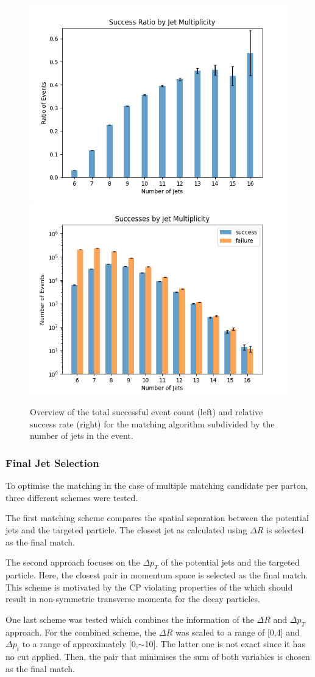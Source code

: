 \documentclass[bachelor,ngerman,english]{GAUBM}
\begin{document}
\begin{figure}
    \centering
    \includegraphics[width=.48\textwidth]{figures/truth_matching/success_ratio.png}\hspace{.03\textwidth}
    \includegraphics[width=.48\textwidth]{figures/truth_matching/success_by_jets.png}
    \caption{Overview of the total successful event count (left) and relative success rate (right) for the matching algorithm subdivided by the number of jets in the event.}
    \label{fig:success_by_jets}
\end{figure}


\subsubsection*{Final Jet Selection}
To optimise the matching in the case of multiple matching candidate per parton, three different schemes were tested. 

The first matching scheme compares the spatial separation between the potential jets and the targeted particle. The closest jet as calculated using $\Delta R$ is selected as the final match. 

The second approach focuses on the $\Delta p_T$ of the potential jets and the targeted particle. Here, the closest pair in momentum space is selected as the final match. This scheme is motivated by the CP violating properties of the \wboson which should result in non-symmetric transverse momenta for the decay particles. 

One last scheme was tested which combines the information of the $\Delta R$ and $\Delta p_T$ approach. For the combined scheme, the $\Delta R$ was scaled to a range of [0,4] and $\Delta p_t$ to a range of approximately [0,$\sim$10]. The latter one is not exact since it has no cut applied. Then, the pair that minimises the sum of both variables is chosen as the final match.
\end{document}
